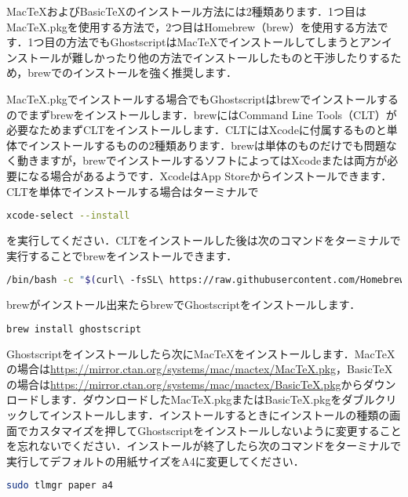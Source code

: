 Mac\TeX およびBasic\TeX のインストール方法には2種類あります．1つ目はMacTeX.pkgを使用する方法で，2つ目はHomebrew（brew）を使用する方法です．1つ目の方法でもGhostscriptはMac\TeX でインストールしてしまうとアンインストールが難しかったり他の方法でインストールしたものと干渉したりするため，brewでのインストールを強く推奨します．

MacTeX.pkgでインストールする場合でもGhostscriptはbrewでインストールするのでまずbrewをインストールします．brewにはCommand Line Tools（CLT）が必要なためまずCLTをインストールします．CLTにはXcodeに付属するものと単体でインストールするものの2種類あります．brewは単体のものだけでも問題なく動きますが，brewでインストールするソフトによってはXcodeまたは両方が必要になる場合があるようです．XcodeはApp Storeからインストールできます．CLTを単体でインストールする場合はターミナルで
\begin{lstlisting}[language=bash]
xcode-select --install
\end{lstlisting}
を実行してください．CLTをインストールした後は次のコマンドをターミナルで実行することでbrewをインストールできます．
\begin{lstlisting}[language=bash]
/bin/bash -c "$(curl\ -fsSL\ https://raw.githubusercontent.com/Homebrew/install/HEAD/install.sh)"
\end{lstlisting}
brewがインストール出来たらbrewでGhostscriptをインストールします．
\begin{lstlisting}[language=bash]
brew install ghostscript
\end{lstlisting}
Ghostscriptをインストールしたら次にMac\TeX をインストールします．Mac\TeX の場合は\url{https://mirror.ctan.org/systems/mac/mactex/MacTeX.pkg}，Basic\TeX の場合は\url{https://mirror.ctan.org/systems/mac/mactex/BasicTeX.pkg}からダウンロードします．ダウンロードしたMacTeX.pkgまたはBasicTeX.pkgをダブルクリックしてインストールします．インストールするときにインストールの種類の画面でカスタマイズを押してGhostscriptをインストールしないように変更することを忘れないでください．インストールが終了したら次のコマンドをターミナルで実行してデフォルトの用紙サイズをA4に変更してください．
\begin{lstlisting}[language=bash]
sudo tlmgr paper a4
\end{lstlisting}


